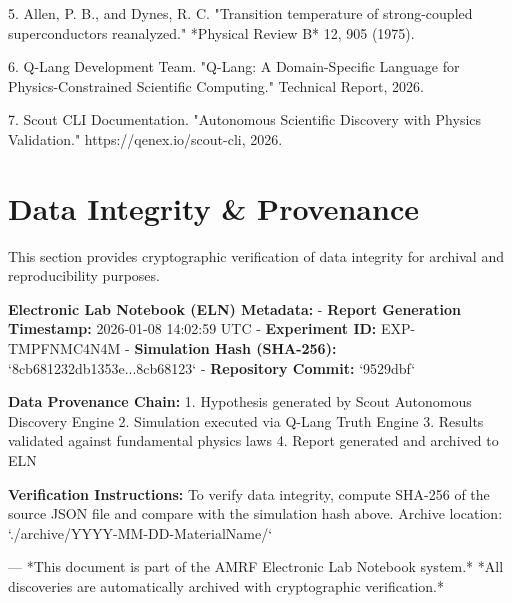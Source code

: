\documentclass[12pt,a4paper]{article}
\begin{document}
5. Allen, P. B., and Dynes, R. C. "Transition temperature of strong-coupled superconductors reanalyzed." *Physical Review B* 12, 905 (1975).

6. Q-Lang Development Team. "Q-Lang: A Domain-Specific Language for Physics-Constrained Scientific Computing." Technical Report, 2026.

7. Scout CLI Documentation. "Autonomous Scientific Discovery with Physics Validation." https://qenex.io/scout-cli, 2026.

\section{Data Integrity \& Provenance} 

This section provides cryptographic verification of data integrity for archival and reproducibility purposes.

\textbf{Electronic Lab Notebook (ELN) Metadata:}
- \textbf{Report Generation Timestamp:} 2026-01-08 14:02:59 UTC
- \textbf{Experiment ID:} EXP-TMPFNMC4N4M
- \textbf{Simulation Hash (SHA-256):} `8cb681232db1353e...8cb68123`
- \textbf{Repository Commit:} `9529dbf`

\textbf{Data Provenance Chain:}
1. Hypothesis generated by Scout Autonomous Discovery Engine
2. Simulation executed via Q-Lang Truth Engine
3. Results validated against fundamental physics laws
4. Report generated and archived to ELN

\textbf{Verification Instructions:}
To verify data integrity, compute SHA-256 of the source JSON file and compare with the simulation hash above.
Archive location: `./archive/YYYY-MM-DD-MaterialName/`

---
*This document is part of the AMRF Electronic Lab Notebook system.*
*All discoveries are automatically archived with cryptographic verification.*
\end{document}
